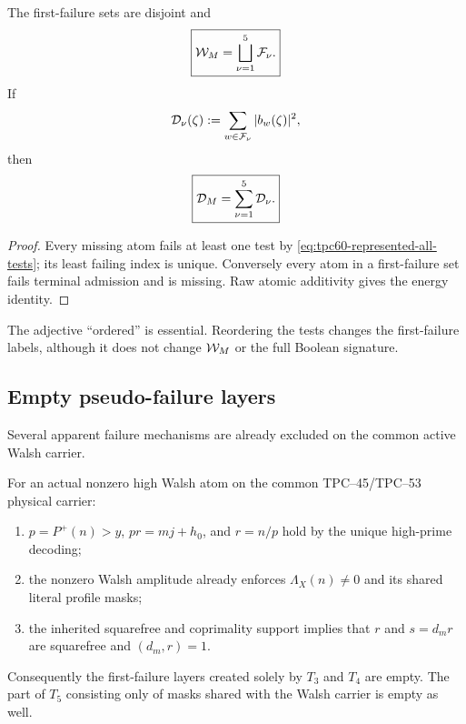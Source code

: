 \begin{proposition}
\label{prop:tpc60-exact-missing-partition}
The first-failure sets are disjoint and
\begin{equation}
 \boxed{
 \mathcal W_M=\bigsqcup_{\nu=1}^5\mathcal F_\nu.}
 \label{eq:tpc60-missing-first-failure-partition}
\end{equation}
If
\begin{equation}
 \mathcal D_\nu(\zeta):=\sum_{w\in\mathcal F_\nu}|b_w(\zeta)|^2,
 \label{eq:tpc60-first-failure-energy}
\end{equation}
then
\begin{equation}
 \boxed{
 \mathcal D_M=\sum_{\nu=1}^5\mathcal D_\nu.}
 \label{eq:tpc60-DM-failure-partition}
\end{equation}
\end{proposition}

\begin{proof}
Every missing atom fails at least one test by
\eqref{eq:tpc60-represented-all-tests}; its least failing index is unique.
Conversely every atom in a first-failure set fails terminal admission and
is missing.  Raw atomic additivity gives the energy identity.
\end{proof}

The adjective ``ordered'' is essential.  Reordering the tests changes the
first-failure labels, although it does not change \(\mathcal W_M\) or the full
Boolean signature.

\subsection{Empty pseudo-failure layers}

Several apparent failure mechanisms are already excluded on the common
active Walsh carrier.

\begin{proposition}
\label{prop:tpc60-inherited-automatic-tests}
For an actual nonzero high Walsh atom on the common TPC--45/TPC--53
physical carrier:
\begin{enumerate}[label=\textup{\(\alph*\)},leftmargin=2.5em]
 \item \(p=P^+(n)>y\), \(pr=mj+h_0\), and \(r=n/p\) hold by the unique
       high-prime decoding;
 \item the nonzero Walsh amplitude already enforces
       \(\Lambda_X(n)\ne0\) and its shared literal profile masks;
 \item the inherited squarefree and coprimality support implies that
       \(r\) and \(s=d_mr\) are squarefree and \((d_m,r)=1\).
\end{enumerate}
Consequently the first-failure layers created solely by \(T_3\) and \(T_4\)
are empty.  The part of \(T_5\) consisting only of masks shared with the
Walsh carrier is empty as well.
\end{proposition}

